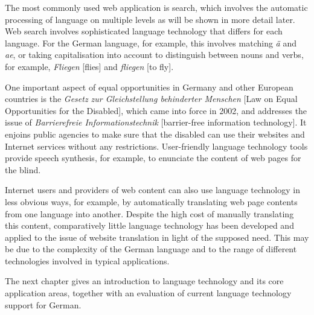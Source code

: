 \documentclass[]{../../metanetpaper}
\begin{document}
\begin{Parallel}[c]{79mm}{78mm}
{The most commonly used web application is search, which involves the automatic processing of language on multiple levels as will be shown in more detail later. Web search involves sophisticated language technology that differs for each language. For the German language, for example, this involves matching \textit{ä} and \textit{ae}, or taking capitalisation into account to distinguish between nouns and verbs, for example, \textit{Fliegen} [flies] and \textit{fliegen} [to fly]. 

One important aspect of equal opportunities in Germany and other European countries is the \textit{Gesetz zur Gleichstellung behinderter Menschen} [Law on Equal Opportunities for the Disabled], which came into force in 2002, and addresses the issue of \textit{Barrierefreie Informationstechnik} [barrier-free information technology]. It enjoins public agencies to make sure that the disabled can use their websites and Internet services without any restrictions. User-friendly language technology tools provide speech synthesis, for example, to enunciate the content of web pages for the blind.

Internet users and providers of web content can also use language technology in less obvious ways, for example, by automatically translating web page contents from one language into another. Despite the high cost of manually translating this content, comparatively little language technology has been developed and applied to the issue of website translation in light of the supposed need. This may be due to the complexity of the German language and to the range of different technologies involved in typical applications. 

The next chapter gives an introduction to language technology and its core application areas, together with an evaluation of current language technology support for German.
  }
  
  \ParallelPar

  \clearpage




\end{Parallel}
\end{document}
